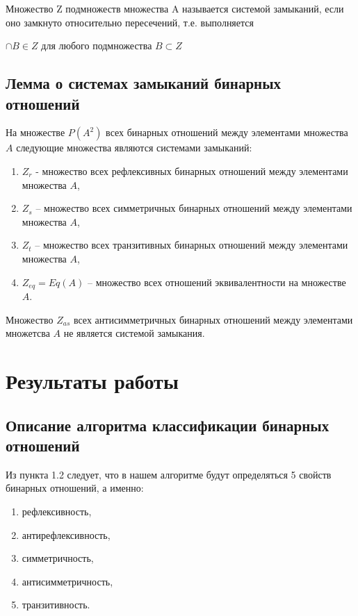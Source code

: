 \documentclass[bachelor, och, labwork]{shiza}
\begin{document}
	Множество Z подмножеств множества A называется $\textit{системой замыканий}$, если оно замкнуто относительно пересечений, т.е. выполняется 
	
	$\cap B \in Z $ для любого подмножества $B \subset Z $
	
	
	\subsection{Лемма о системах замыканий бинарных отношений}
	  На множестве $P(A^2)$ всех бинарных отношений между элементами множества $A$ следующие множества являются системами замыканий:
	
	\begin{enumerate}
		\item $Z_r$ - множество всех рефлексивных бинарных отношений между элементами множества $A$,
		\item $Z_s$ – множество всех симметричных бинарных отношений между элементами множества $A$,
		\item $Z_t$ – множество всех транзитивных бинарных отношений между элементами множества $A$,
		\item $Z_{eq} = Eq(A)$ – множество всех отношений эквивалентности на множестве $A$.
	\end{enumerate}

	Множество $Z_{as}$ всех антисимметричных бинарных отношений между элементами множетсва $A$ не является системой замыкания.
	
	\section{Результаты работы}
	\subsection{Описание алгоритма классификации бинарных отношений}
	
	Из пункта 1.2 следует, что в нашем алгоритме будут определяться 5 свойств бинарных отношений, а именно:
	
	\begin{enumerate}
		\item рефлексивность,
		\item антирефлексивность,
		\item симметричность,
		\item антисимметричность,
		\item транзитивность.
	\end{enumerate}
	
\end{document}
